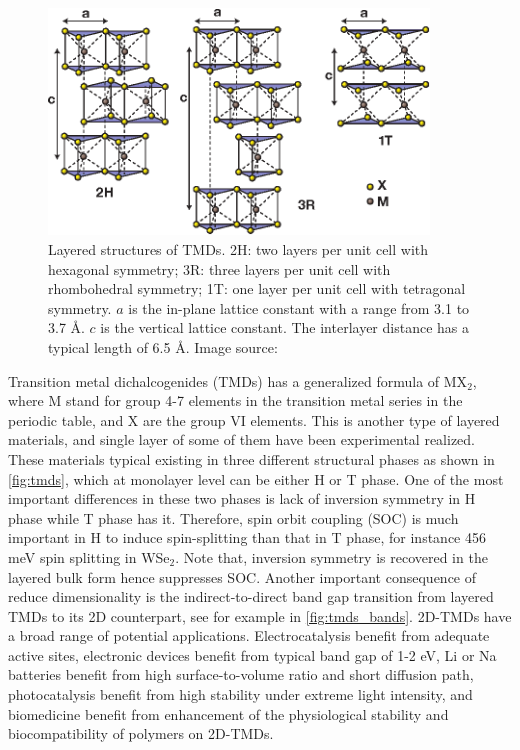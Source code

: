\begin{figure}[htbp!] 
\centering  
\includegraphics[width=0.9\textwidth]{tmds.eps}
\caption[Layered structures of TMDs]{Layered structures of TMDs. 2H: two layers per unit cell with hexagonal symmetry; 3R: three layers per unit cell with rhombohedral symmetry; 1T: one layer per unit cell with tetragonal symmetry. $a$ is the in-plane lattice constant with a range from 3.1 to 3.7 \AA. $c$ is the vertical lattice constant. The interlayer distance has a typical length of 6.5 \AA. Image source: \cite{Wang2012}}  
\label{fig:tmds}
\end{figure} 

Transition metal dichalcogenides (TMDs) has a generalized formula of MX$_2$, where M stand for group 4-7 elements in the transition metal series in the periodic table, and X are the group VI elements. This is another type of layered materials, and single layer of some of them have been experimental realized.  These materials typical existing in three different structural phases as shown in \autoref{fig:tmds}, which at monolayer level can be either H or T phase. One of the most important differences in these two phases is lack of inversion symmetry in H phase while T phase has it. Therefore, spin orbit coupling (SOC) is much important in H to induce spin-splitting than that in T phase, for instance 456 meV spin splitting in WSe$_2$\cite{Zhu2011giant}. Note that, inversion symmetry is recovered in the layered bulk form hence suppresses SOC. Another important consequence of reduce dimensionality is the indirect-to-direct band gap transition from layered TMDs to its 2D counterpart, see for example in \autoref{fig:tmds_bands}. 2D-TMDs have a broad range of potential applications. Electrocatalysis\cite{kim2013enhanced,huang2014synthesis} benefit from adequate active sites, electronic devices\cite{RadisavljevicB2011,sun2014fabrication} benefit from typical band gap of 1-2 eV, Li or Na batteries\cite{chang2011cysteine,chen2013situ} benefit from high surface-to-volume ratio and short diffusion path, photocatalysis benefit from high stability under extreme light intensity\cite{Li2013,Parzinger2015}, and biomedicine benefit from enhancement of the physiological stability and biocompatibility of polymers on 2D-TMDs\cite{Cheng2014,Yin2014}. 



